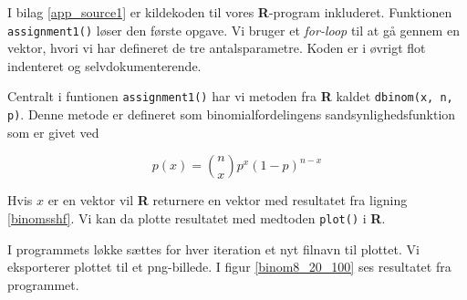 {
I bilag \ref{app_source1} er kildekoden til vores \textbf{R}-program inkluderet.
Funktionen \texttt{assignment1()} løser den første opgave. Vi bruger et
\emph{for-loop} til at gå gennem en vektor, hvori vi har defineret de tre
antalsparametre. Koden er i øvrigt flot indenteret og selvdokumenterende.

Centralt i funtionen \texttt{assignment1()} har vi metoden fra
\textbf{R} kaldet \texttt{dbinom(x, n, p)}. Denne metode er defineret som
binomialfordelingens sandsynlighedsfunktion som er givet ved

\begin{equation}
    p(x) = \binom{n}{x}p^{x}(1 - p)^{n - x}
    \label{binomsshf}
\end{equation}

Hvis $x$ er en vektor vil \textbf{R} returnere en vektor med resultatet
fra ligning \ref{binomsshf}. Vi kan da plotte resultatet med medtoden
\texttt{plot()} i \textbf{R}.

I programmets løkke sættes for hver iteration et nyt filnavn til plottet.
Vi eksporterer plottet til et png-billede. I figur \ref{binom8_20_100}
ses resultatet fra programmet.

}
